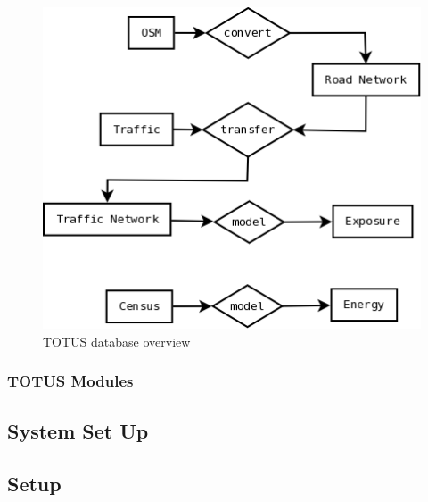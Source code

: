 \begin{figure}
	\caption{TOTUS database overview}
	\label{fig:db_diag}
	\includegraphics[width = 12cm]{system_data.png}
\end{figure}

\subsubsection*{TOTUS Modules}

\subsection*{System Set Up}

\subsection{Setup}
